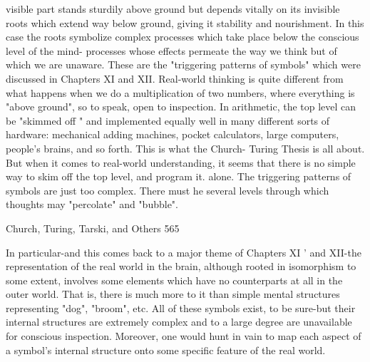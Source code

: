 {visible part stands sturdily above ground but depends vitally on its invisible roots which
extend way below ground, giving it stability and nourishment. In this case the roots
symbolize complex processes which take place below the conscious level of the mind-
processes whose effects permeate the way we think but of which we are unaware. These
are the "triggering patterns of symbols" which were discussed in Chapters XI and XII.
        Real-world thinking is quite different from what happens when we do a
multiplication of two numbers, where everything is "above ground", so to speak, open to
inspection. In arithmetic, the top level can be "skimmed off " and implemented equally
well in many different sorts of hardware: mechanical adding machines, pocket
calculators, large computers, people's brains, and so forth. This is what the Church-
Turing Thesis is all about. But when it comes to real-world understanding, it seems that
there is no simple way to skim off the top level, and program it. alone. The triggering
patterns of symbols are just too complex. There must he several levels through which
thoughts may "percolate" and "bubble".




Church, Turing, Tarski, and Others                                                       565

        In particular-and this comes back to a major theme of Chapters XI ' and XII-the
representation of the real world in the brain, although rooted in isomorphism to some
extent, involves some elements which have no counterparts at all in the outer world. That
is, there is much more to it than simple mental structures representing "dog", "broom",
etc. All of these symbols exist, to be sure-but their internal structures are extremely
complex and to a large degree are unavailable for conscious inspection. Moreover, one
would hunt in vain to map each aspect of a symbol's internal structure onto some specific
feature of the real world.

}
